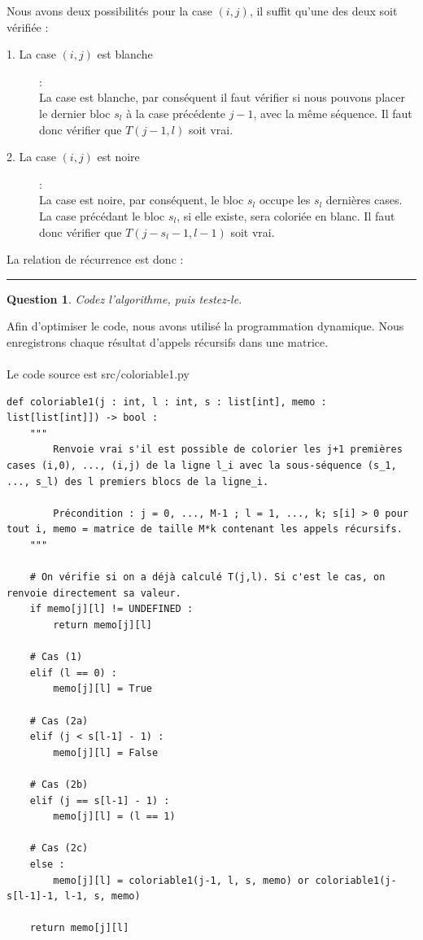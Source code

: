 \documentclass[a4paper,12pt]{article}
\newtheorem{exo}{Question}
\begin{document}
Nous avons deux possibilités pour la case $(i,j)$, il suffit qu'une des deux soit vérifiée :
\begin{description}
	\item[1. La case $(i,j)$ est blanche] :\\
	La case est blanche, par conséquent il faut vérifier si nous pouvons placer le dernier bloc $s_l$ à la case précédente $j-1$, avec la même séquence. Il faut donc vérifier que $T(j-1, l)$ soit vrai.

	\item[2. La case $(i,j)$ est noire] :\\
	La case est noire, par conséquent, le bloc $s_l$ occupe les $s_l$ dernières cases. La case précédant le bloc $s_l$, si elle existe, sera coloriée en blanc. Il faut donc vérifier que $T(j-s_l-1, l-1)$ soit vrai.
\end{description}

La relation de récurrence est  donc : 
\\

\noindent\rule{\textwidth}{1pt}


\begin{exo}
	Codez l'algorithme, puis testez-le.
\end{exo}

Afin d'optimiser le code, nous avons utilisé la programmation dynamique. Nous enregistrons chaque résultat d'appels récursifs dans une matrice.\\\\
Le code source est src/coloriable1.py\\

\newpage

\begin{lstlisting}
def coloriable1(j : int, l : int, s : list[int], memo : list[list[int]]) -> bool :
    """
        Renvoie vrai s'il est possible de colorier les j+1 premières cases (i,0), ..., (i,j) de la ligne l_i avec la sous-séquence (s_1, ..., s_l) des l premiers blocs de la ligne_i.
    
        Précondition : j = 0, ..., M-1 ; l = 1, ..., k; s[i] > 0 pour tout i, memo = matrice de taille M*k contenant les appels récursifs.
    """
        
    # On vérifie si on a déjà calculé T(j,l). Si c'est le cas, on renvoie directement sa valeur.
    if memo[j][l] != UNDEFINED :
        return memo[j][l]
    
    # Cas (1)
    elif (l == 0) :
        memo[j][l] = True
        
    # Cas (2a)
    elif (j < s[l-1] - 1) :
        memo[j][l] = False
        
    # Cas (2b)
    elif (j == s[l-1] - 1) :
        memo[j][l] = (l == 1)
    
    # Cas (2c)  
    else :
        memo[j][l] = coloriable1(j-1, l, s, memo) or coloriable1(j-s[l-1]-1, l-1, s, memo)
        
    return memo[j][l]
\end{lstlisting}
\end{document}

